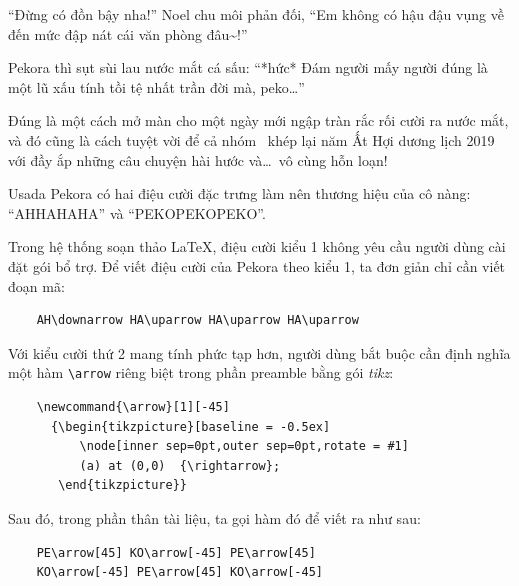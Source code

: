 \documentclass[../main.tex]{subfiles}
\begin{document}
``Đừng có đồn bậy nha!'' Noel chu môi phản đối, ``Em không có hậu đậu vụng về đến mức đập nát cái văn phòng đâu\~{}!''

Pekora thì sụt sùi lau nước mắt cá sấu: ``*hức* Đám người mấy người đúng là một lũ xấu tính tồi tệ nhất trần đời mà, peko\dots''

Đúng là một cách mở màn cho một ngày mới ngập tràn rắc rối cười ra nước mắt, và đó cũng là cách tuyệt vời để cả nhóm \hll\ khép lại năm Ất Hợi dương lịch 2019 với đầy ắp những câu chuyện hài hước và\dots\ vô cùng hỗn loạn!

\trva

Usada Pekora có hai điệu cười đặc trưng làm nên thương hiệu của cô nàng: ``AH\downarrow HA\uparrow HA\uparrow HA\uparrow'' và ``PE\arrow[45] KO\arrow[-45] PE\arrow[45] KO\arrow[-45] PE\arrow[45] KO\arrow[-45]''.

Trong hệ thống soạn thảo \LaTeX, điệu cười kiểu 1 không yêu cầu người dùng cài đặt gói bổ trợ. Để viết điệu cười của Pekora theo kiểu 1, ta đơn giản chỉ cần viết đoạn mã:

\begin{verbatim}
    AH\downarrow HA\uparrow HA\uparrow HA\uparrow
\end{verbatim}

Với kiểu cười thứ 2 mang tính phức tạp hơn, người dùng bắt buộc cần định nghĩa một hàm \verb|\arrow| riêng biệt trong phần preamble bằng gói \textit{tikz}:
\begin{verbatim}
    \newcommand{\arrow}[1][-45]
      {\begin{tikzpicture}[baseline = -0.5ex]
          \node[inner sep=0pt,outer sep=0pt,rotate = #1] 
          (a) at (0,0)  {\rightarrow};
       \end{tikzpicture}}
\end{verbatim}

Sau đó, trong phần thân tài liệu, ta gọi hàm đó để viết ra như sau:
\begin{verbatim}
    PE\arrow[45] KO\arrow[-45] PE\arrow[45] 
    KO\arrow[-45] PE\arrow[45] KO\arrow[-45]
\end{verbatim}
\end{document}
